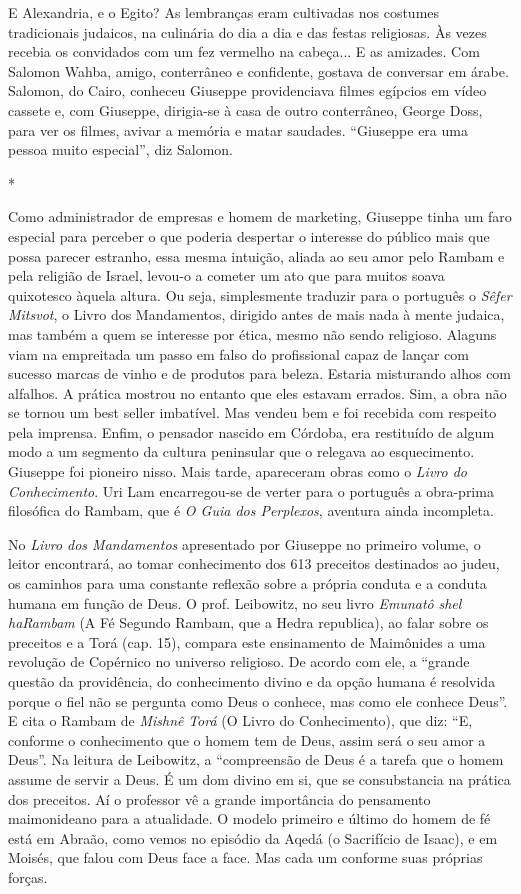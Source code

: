 E Alexandria, e o Egito? As lembranças eram cultivadas nos costumes
tradicionais judaicos, na culinária do dia a dia e das festas
religiosas. Às vezes recebia os convidados com um fez vermelho na
cabeça... E as amizades. Com Salomon Wahba, amigo, conterrâneo e
confidente, gostava de conversar em árabe. Salomon, do Cairo, conheceu
Giuseppe providenciava filmes egípcios em vídeo cassete e, com Giuseppe,
dirigia-se à casa de outro conterrâneo, George Doss, para ver os filmes,
avivar a memória e matar saudades. ``Giuseppe era uma pessoa muito
especial'', diz Salomon.

*

Como administrador de empresas e homem de marketing, Giuseppe tinha um
faro especial para perceber o que poderia despertar o interesse do
público mais que possa parecer estranho, essa mesma intuição, aliada ao
seu amor pelo Rambam e pela religião de Israel, levou-o a cometer um ato
que para muitos soava quixotesco àquela altura. Ou seja, simplesmente
traduzir para o português o \emph{Sêfer Mitsvot}, o Livro dos
Mandamentos, dirigido antes de mais nada à mente judaica, mas também a
quem se interesse por ética, mesmo não sendo religioso. Alaguns viam na
empreitada um passo em falso do profissional capaz de lançar com sucesso
marcas de vinho e de produtos para beleza. Estaria misturando alhos com
alfalhos. A prática mostrou no entanto que eles estavam errados. Sim, a
obra não se tornou um best seller imbatível. Mas vendeu bem e foi
recebida com respeito pela imprensa. Enfim, o pensador nascido em
Córdoba, era restituído de algum modo a um segmento da cultura
peninsular que o relegava ao esquecimento. Giuseppe foi pioneiro nisso.
Mais tarde, apareceram obras como o \emph{Livro do Conhecimento}. Uri
Lam encarregou-se de verter para o português a obra-prima filosófica do
Rambam, que é \emph{O Guia dos Perplexos}, aventura ainda incompleta.

No \emph{Livro dos Mandamentos} apresentado por Giuseppe no primeiro
volume, o leitor encontrará, ao tomar conhecimento dos 613 preceitos
destinados ao judeu, os caminhos para uma constante reflexão sobre a
própria conduta e a conduta humana em função de Deus. O prof. Leibowitz,
no seu livro \emph{Emunatô} \emph{shel haRambam} (A Fé Segundo Rambam,
que a Hedra republica), ao falar sobre os preceitos e a Torá (cap. 15),
compara este ensinamento de Maimônides a uma revolução de Copérnico no
universo religioso. De acordo com ele, a ``grande questão da
providência, do conhecimento divino e da opção humana é resolvida porque
o fiel não se pergunta como Deus o conhece, mas como ele conhece Deus''.
E cita o Rambam de \emph{Mishnê} \emph{Torá} (O Livro do Conhecimento),
que diz: ``E, conforme o conhecimento que o homem tem de Deus, assim
será o seu amor a Deus''. Na leitura de Leibowitz, a ``compreensão de
Deus é a tarefa que o homem assume de servir a Deus. É um dom divino em
si, que se consubstancia na prática dos preceitos. Aí o professor vê a
grande importância do pensamento maimonideano para a atualidade. O
modelo primeiro e último do homem de fé está em Abraão, como vemos no
episódio da Aqedá (o Sacrifício de Isaac), e em Moisés, que falou com
Deus face a face. Mas cada um conforme suas próprias forças.

